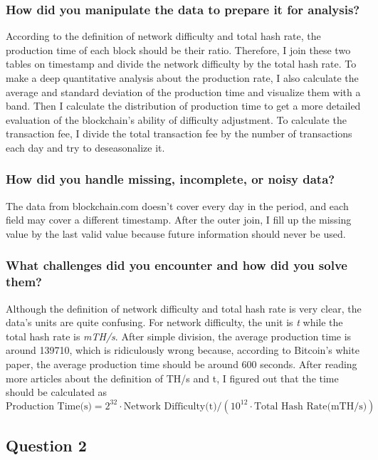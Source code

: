 \documentclass[a4paper]{article}
\begin{document}
\subsubsection{How did you manipulate the data to prepare it for analysis?}
    According to the definition of network difficulty and total hash rate, the production time of each block should be their ratio. Therefore, I join these two tables on timestamp and divide the network difficulty by the total hash rate. To make a deep quantitative analysis about the production rate, I also calculate the average and standard deviation of the production time and visualize them with a band. Then I calculate the distribution of production time to get a more detailed evaluation of the blockchain's ability of difficulty adjustment. To calculate the transaction fee, I divide the total transaction fee by the number of transactions each day and try to deseasonalize it. 
\subsubsection{How did you handle missing, incomplete, or noisy data?}
    The data from blockchain.com doesn't cover every day in the period, and each field may cover a different timestamp. After the outer join, I fill up the missing value by the last valid value because future information should never be used.
\subsubsection{What challenges did you encounter and how did you solve them?}
    Although the definition of network difficulty and total hash rate is very clear, the data's units are quite confusing. For network difficulty, the unit is \emph{t} while the total hash rate is \emph{mTH/s}. After simple division, the average production time is around 139710, which is ridiculously wrong because, according to Bitcoin's white paper, the average production time should be around 600 seconds. After reading more articles about the definition of TH/s and t, I figured out that the time should be calculated as 
    $$\text{Production Time(s)}=2^{32}\cdot\text{Network Difficulty(t)}/(10^{12}\cdot\text{Total Hash Rate(mTH/s)})$$
\subsection{Question 2}
\end{document}
